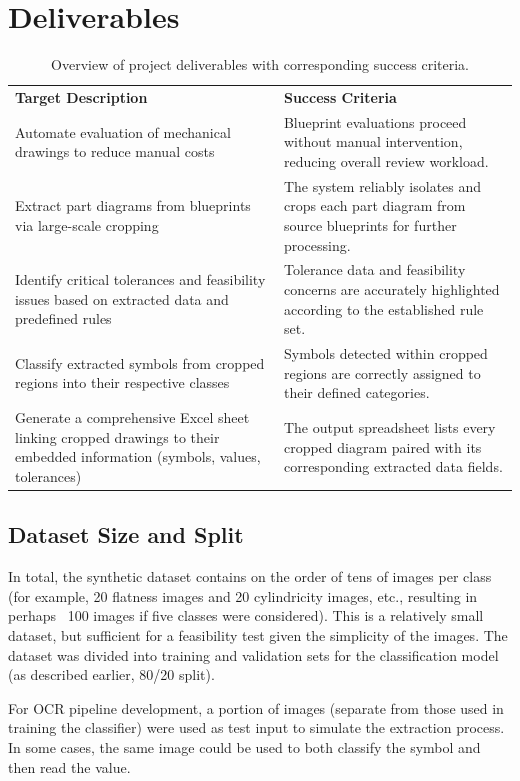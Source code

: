 \documentclass[11pt,a4paper]{article}
\begin{document}
\section{Deliverables}
\begin{table}[H]
  \centering
  \begin{tabular}{p{} p{}}
    \textbf{Target Description} & \textbf{Success Criteria} \\
    Automate evaluation of mechanical drawings to reduce manual costs & Blueprint evaluations proceed without manual intervention, reducing overall review workload. \\
    Extract part diagrams from blueprints via large-scale cropping & The system reliably isolates and crops each part diagram from source blueprints for further processing. \\
    Identify critical tolerances and feasibility issues based on extracted data and predefined rules & Tolerance data and feasibility concerns are accurately highlighted according to the established rule set. \\
    Classify extracted symbols from cropped regions into their respective classes & Symbols detected within cropped regions are correctly assigned to their defined categories. \\
    Generate a comprehensive Excel sheet linking cropped drawings to their embedded information (symbols, values, tolerances) & The output spreadsheet lists every cropped diagram paired with its corresponding extracted data fields. \\
  \end{tabular}
  \caption{Overview of project deliverables with corresponding success criteria.}
  \label{tab:deliverables}
\end{table}


\subsection*{Dataset Size and Split}
In total, the synthetic dataset contains on the order of tens of images per class (for example, 20 flatness images and 20 cylindricity images, etc., resulting in perhaps ~100 images if five classes were considered). This is a relatively small dataset, but sufficient for a feasibility test given the simplicity of the images. The dataset was divided into training and validation sets for the classification model (as described earlier, 80/20 split). 

For OCR pipeline development, a portion of images (separate from those used in training the classifier) were used as test input to simulate the extraction process. In some cases, the same image could be used to both classify the symbol and then read the value.
\end{document}
